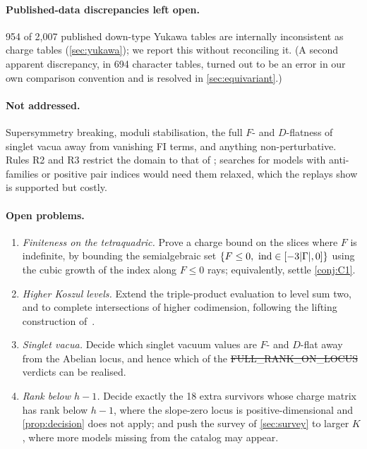\paragraph{Published-data discrepancies left open.} 954 of 2,007 published down-type Yukawa
tables are internally inconsistent as charge tables (\cref{sec:yukawa}); we
report this without reconciling it. (A second apparent discrepancy, in 694
character tables, turned out to be an error in our own comparison convention and
is resolved in \cref{sec:equivariant}.)

\paragraph{Not addressed.} Supersymmetry breaking, moduli stabilisation, the
full $F$- and $D$-flatness of singlet vacua away from vanishing FI terms, and
anything non-perturbative. Rules R2 and R3 restrict the domain to that of
\cite{ACGLP2013}; searches for models with anti-families or positive pair indices
would need them relaxed, which the replays show is supported but costly.

\paragraph{Open problems.}
\begin{enumerate}[leftmargin=*]
\item \emph{Finiteness on the tetraquadric.} Prove a charge bound on the slices
  where $F$ is indefinite, by bounding the semialgebraic set
  $\{F\le0,\ \operatorname{ind}\in[-3|\Gamma|,0]\}$ using the cubic growth of the index along
  $F\le0$ rays; equivalently, settle \cref{conj:C1}.
\item \emph{Higher Koszul levels.} Extend the triple-product evaluation to
  level sum two, and to complete intersections of higher codimension, following
  the lifting construction of~\cite{BBCL2016,BBL2017}.
\item \emph{Singlet vacua.} Decide which singlet vacuum values are $F$- and
  $D$-flat away from the Abelian locus, and hence which of the
  \st{FULL\_RANK\_ON\_LOCUS} verdicts can be realised.
\item \emph{Rank below $h-1$.} Decide exactly the 18 extra survivors whose charge
  matrix has rank below $h-1$, where the slope-zero locus is positive-dimensional
  and \cref{prop:decision} does not apply; and push the survey of
  \cref{sec:survey} to larger $K$, where more models missing from the catalog may
  appear.
\end{enumerate}
